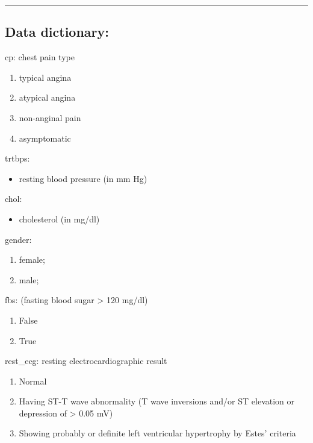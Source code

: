 \documentclass[
]{article}
\providecommand{\tightlist}{%
  \setlength{\itemsep}{0pt}\setlength{\parskip}{0pt}}
\begin{document}
\begin{center}\rule{0.5\linewidth}{0.5pt}\end{center}

\subsection{Data dictionary:}\label{data-dictionary}

cp: chest pain type

\begin{enumerate}
\def\labelenumi{\arabic{enumi}.}
\tightlist
\item
  typical angina
\item
  atypical angina
\item
  non-anginal pain
\item
  asymptomatic
\end{enumerate}

trtbps:

\begin{itemize}
\tightlist
\item
  resting blood pressure (in mm Hg)
\end{itemize}

chol:

\begin{itemize}
\tightlist
\item
  cholesterol (in mg/dl)
\end{itemize}

gender:

\begin{enumerate}
\def\labelenumi{\arabic{enumi}.}
\tightlist
\item
  female;
\item
  male;
\end{enumerate}

fbs: (fasting blood sugar \textgreater{} 120 mg/dl)

\begin{enumerate}
\def\labelenumi{\arabic{enumi}.}
\setcounter{enumi}{-1}
\tightlist
\item
  False
\item
  True
\end{enumerate}

rest\_ecg: resting electrocardiographic result

\begin{enumerate}
\def\labelenumi{\arabic{enumi}.}
\setcounter{enumi}{-1}
\tightlist
\item
  Normal
\item
  Having ST-T wave abnormality (T wave inversions and/or ST elevation or
  depression of \textgreater{} 0.05 mV)
\item
  Showing probably or definite left ventricular hypertrophy by Estes'
  criteria
\end{enumerate}
\end{document}
